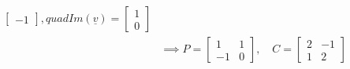 \documentclass[11pt, a4paper, norsk]{article}
\begin{document}
\begin{Example}{}{}
\begin{align*}
\begin{bmatrix}
                                     -1
                                 \end{bmatrix}, quad Im(\underline{v}) = \begin{bmatrix}
                                     1 \\
                                     0
                                 \end{bmatrix}
                                 \\
                                 &\implies P = \begin{bmatrix}
                                     1 & 1 \\
                                     -1 & 0
                                 \end{bmatrix}, \quad C = \begin{bmatrix}
                                     2 & -1 \\
                                     1 & 2
                                 \end{bmatrix}
            \end{align*}
        \end{Example}
\end{document}
